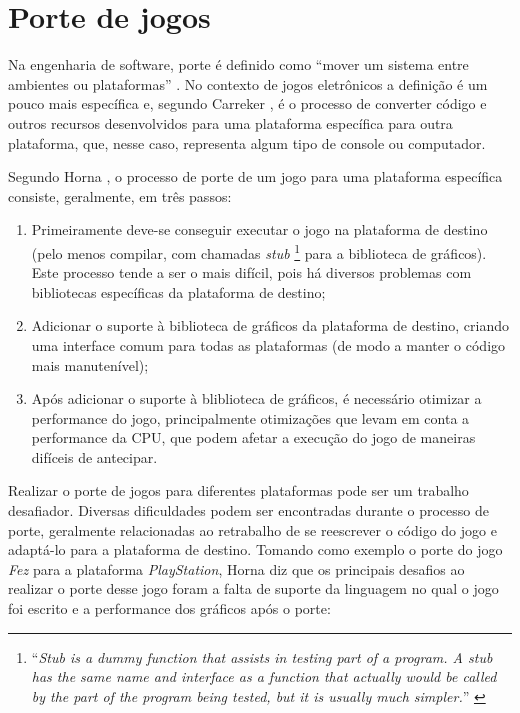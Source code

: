 \section{Porte de jogos}

Na engenharia de software, porte é definido como ``mover um sistema entre ambientes ou plataformas'' \cite{frakes}. No contexto de jogos eletrônicos a definição é um pouco mais específica e, segundo Carreker \cite{carreker}, é o processo de converter código e outros recursos desenvolvidos para uma plataforma específica para outra plataforma, que, nesse caso, representa algum tipo de console ou computador.

Segundo Horna \cite{wawro}, o processo de porte de um jogo para uma plataforma específica consiste, geralmente, em três passos:

\begin{enumerate}
  \item Primeiramente deve-se conseguir executar o jogo na plataforma de destino (pelo menos compilar, com chamadas \textit{stub} \footnote{``\textit{Stub is a dummy function that assists in testing part of a program. A stub has the same name and interface as a function that actually would be called by the part of the program being tested, but it is usually much simpler.}'' \cite{dale}} para a biblioteca de gráficos). Este processo tende a ser o mais difícil, pois há diversos problemas com bibliotecas específicas da plataforma de destino;
  \item Adicionar o suporte à biblioteca de gráficos da plataforma de destino, criando uma interface comum para todas as plataformas (de modo a manter o código mais manutenível);
  \item Após adicionar o suporte à bliblioteca de gráficos, é necessário otimizar a performance do jogo, principalmente otimizações que levam em conta a performance da CPU, que podem afetar a execução do jogo de maneiras difíceis de antecipar.
\end{enumerate}

Realizar o porte de jogos para diferentes plataformas pode ser um trabalho desafiador. Diversas dificuldades podem ser encontradas durante o processo de porte, geralmente relacionadas ao retrabalho de se reescrever o código do jogo e adaptá-lo para a plataforma de destino. Tomando como exemplo o porte do jogo \textit{Fez} para a plataforma \textit{PlayStation}, Horna diz que os principais desafios ao realizar o porte desse jogo foram a falta de suporte da linguagem no qual o jogo foi escrito e a performance dos gráficos após o porte:

